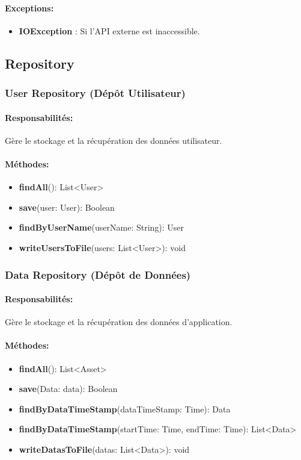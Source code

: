 \documentclass{article}
\begin{document}
\paragraph{Exceptions:}
\begin{itemize}
  \item \textbf{IOException} : Si l'API externe est inaccessible.
\end{itemize}
\subsection{Repository}
\subsubsection{User Repository (Dépôt Utilisateur)}
\paragraph{Responsabilités:} Gère le stockage et la récupération des données utilisateur.
\paragraph{Méthodes:}
\begin{itemize}
  \item \textbf{findAll}(): List<User>
  \item \textbf{save}(user: User): Boolean
  \item \textbf{findByUserName}(userName: String): User
  \item \textbf{writeUsersToFile}(users: List<User>): void
\end{itemize}

\subsubsection{Data Repository (Dépôt de Données)}
\paragraph{Responsabilités:} Gère le stockage et la récupération des données d'application.
\paragraph{Méthodes:}
\begin{itemize}
  \item \textbf{findAll}(): List<Asset>
  \item \textbf{save}(Data: data): Boolean
  \item \textbf{findByDataTimeStamp}(dataTimeStamp: Time): Data
  \item \textbf{findByDataTimeStamp}(startTime: Time, endTime: Time): List<Data>
  \item \textbf{writeDatasToFile}(datas: List<Data>): void 
\end{itemize}
\end{document}
